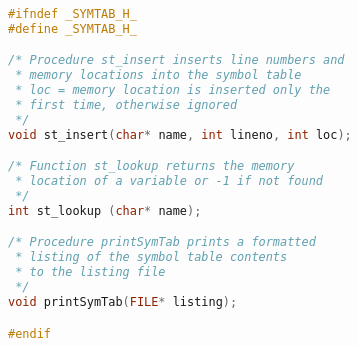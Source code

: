 \documentclass[lang=cn,10pt]{elegantbook}
\begin{document}
\begin{lstlisting}[caption={symtab.h},language=c]
#ifndef _SYMTAB_H_
#define _SYMTAB_H_

/* Procedure st_insert inserts line numbers and
 * memory locations into the symbol table
 * loc = memory location is inserted only the
 * first time, otherwise ignored
 */
void st_insert(char* name, int lineno, int loc);

/* Function st_lookup returns the memory 
 * location of a variable or -1 if not found
 */
int st_lookup (char* name);

/* Procedure printSymTab prints a formatted 
 * listing of the symbol table contents 
 * to the listing file
 */
void printSymTab(FILE* listing);

#endif
\end{lstlisting}
\end{document}
